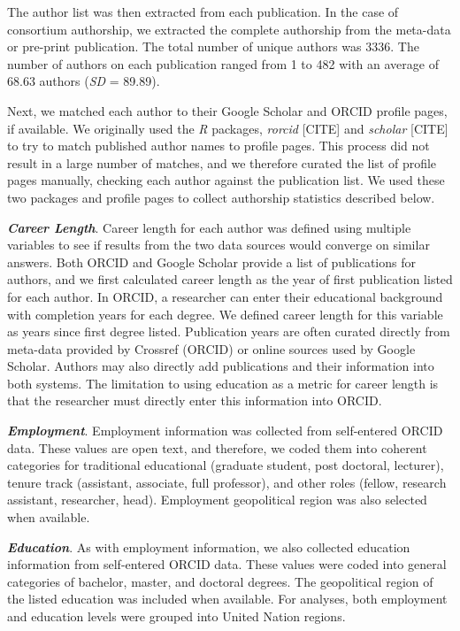 \documentclass[
  english,
  man]{apa6}
\begin{document}
The author list was then extracted from each publication. In the case of consortium authorship, we extracted the complete authorship from the meta-data or pre-print publication. The total number of unique authors was 3336. The number of authors on each publication ranged from 1 to 482 with an average of 68.63 authors (\emph{SD} = 89.89).

Next, we matched each author to their Google Scholar and ORCID profile pages, if available. We originally used the \emph{R} packages, \emph{rorcid} {[}CITE{]} and \emph{scholar} {[}CITE{]} to try to match published author names to profile pages. This process did not result in a large number of matches, and we therefore curated the list of profile pages manually, checking each author against the publication list. We used these two packages and profile pages to collect authorship statistics described below.

\textbf{\emph{Career Length}}. Career length for each author was defined using multiple variables to see if results from the two data sources would converge on similar answers. Both ORCID and Google Scholar provide a list of publications for authors, and we first calculated career length as the year of first publication listed for each author. In ORCID, a researcher can enter their educational background with completion years for each degree. We defined career length for this variable as years since first degree listed. Publication years are often curated directly from meta-data provided by Crossref (ORCID) or online sources used by Google Scholar. Authors may also directly add publications and their information into both systems. The limitation to using education as a metric for career length is that the researcher must directly enter this information into ORCID.

\textbf{\emph{Employment}}. Employment information was collected from self-entered ORCID data. These values are open text, and therefore, we coded them into coherent categories for traditional educational (graduate student, post doctoral, lecturer), tenure track (assistant, associate, full professor), and other roles (fellow, research assistant, researcher, head). Employment geopolitical region was also selected when available.

\textbf{\emph{Education}}. As with employment information, we also collected education information from self-entered ORCID data. These values were coded into general categories of bachelor, master, and doctoral degrees. The geopolitical region of the listed education was included when available. For analyses, both employment and education levels were grouped into United Nation regions.
\end{document}
